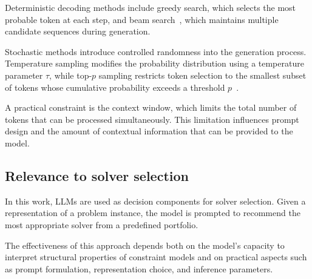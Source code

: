 \documentclass[../../main]{subfiles}
\begin{document}
Deterministic decoding methods include greedy search, which selects the most probable token at each step, and beam search~\cite{BeamSearch}, which maintains multiple candidate sequences during generation.

Stochastic methods introduce controlled randomness into the generation process. Temperature sampling modifies the probability distribution using a temperature parameter \(\tau\), while top-\(p\) sampling restricts token selection to the smallest subset of tokens whose cumulative probability exceeds a threshold \(p\)~\cite{LLMDecoding}.

A practical constraint is the context window, which limits the total number of tokens that can be processed simultaneously. This limitation influences prompt design and the amount of contextual information that can be provided to the model.

\subsection{Relevance to solver selection}

In this work, LLMs are used as decision components for solver selection. Given a representation of a problem instance, the model is prompted to recommend the most appropriate solver from a predefined portfolio.

The effectiveness of this approach depends both on the model's capacity to interpret structural properties of constraint models and on practical aspects such as prompt formulation, representation choice, and inference parameters.
\end{document}
